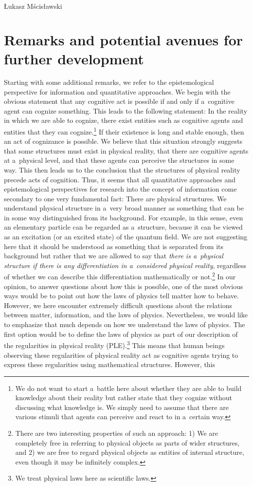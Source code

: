 \begin{artengenv}{Łukasz Mścisławski}
\section*{Remarks and potential avenues for further development}
Starting with some additional remarks, we refer to the epistemological perspective for information and quantitative approaches. We begin with the obvious statement that any cognitive act is possible if and only if a~cognitive agent can cognize something. This leads to the following statement: In the reality in which we are able to cognize, there exist entities such as cognitive agents and entities that they can cognize.\footnote{We do not want to start a~battle here about whether they are able to build knowledge about their reality but rather state that they cognize without discussing what knowledge is. We simply need to assume that there are various stimuli that agents can perceive and react to in a~certain way.} If their existence is long and stable enough, then an act of cognizance is possible. We believe that this situation strongly suggests that some structures must exist in physical reality, that there are cognitive agents at a~physical level, and that these agents can perceive the structures in some way. This then leads us to the conclusion that the structures of physical reality precede acts of cognition. Thus, it seems that all quantitative approaches and epistemological perspectives for research into the concept of information come secondary to one very fundamental fact: There are physical structures. We understand physical structure in a~very broad manner as something that can be in some way distinguished from its background. For example, in this sense, even an elementary particle can be regarded as a~structure, because it can be viewed as an excitation (or an excited state) of the quantum field. We are not suggesting here that it should be understood as something that is separated from its background but rather that we are allowed to say that \textit{there is a~physical structure if there is any differentiation in a~considered physical reality}, regardless of whether we can describe this differentiation mathematically or not.\footnote{There are two interesting properties of such an approach: 1) We are completely free in referring to physical objects as parts of wider structures, and 2) we are free to regard physical objects as entities of internal structure, even though it may be infinitely complex.} In our opinion, to answer questions about how this is possible, one of the most obvious ways would be to point out how the laws of physics tell matter how to behave. However, we here encounter extremely difficult questions about the relations between matter, information, and the laws of physics. Nevertheless, we would like to emphasize that much depends on how we understand the laws of physics. The first option would be to define the laws of physics as part of our description of the regularities in physical reality (PLE).\footnote{We treat physical laws here as scientific laws.} This means that human beings observing these regularities of physical reality act as cognitive agents trying to express these regularities using mathematical structures. However, this 
\end{artengenv}
